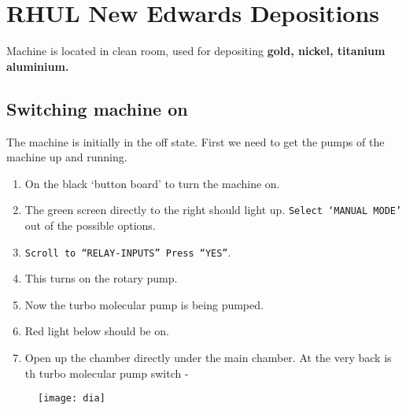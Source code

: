 \section{RHUL New Edwards Depositions\label{sec:edwards500}}
\newcommand{\imedwardsFiveHundred}{\hyperref[sec:edwards500]{\quote{\textbf{\underline{Edwards
          500}}}}}

Machine is located  in clean room, used  for depositing \textbf{gold,
  nickel, titanium  aluminium.} 
\subsection{Switching machine on}
The machine is initially  in the off state. First we  need to get the
pumps of the machine up and running.
\begin{enumerate}
\item  On the  black `button  board'  to turn the machine on.
\item  The   green  screen  directly   to  the  right   should  light
  up. \texttt{Select `MANUAL MODE'} out of the possible options.
\item     \texttt{Scroll    to     ``RELAY-INPUTS''    \ira     Press
    ``YES''}. 
\item {}
  This turns on the rotary pump.
\item {}
  Now the turbo molecular pump is being pumped.
\item {} Red light below  should be on.
\item Open  up the chamber directly  under the main chamber.   At the
  very back is  th turbo molecular pump switch -  
\end{enumerate}

 \begin{figure}[htbp]
   \centering \texttt{[image: dia]}
 \end{figure}
